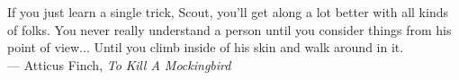 \thispagestyle{empty}
{}

\vspace*{3cm}

\begin{center}
    If you just learn a single trick, Scout, you'll get along a lot better with all kinds of folks. You never really understand a person until you consider things from his point of view... Until you climb inside of his skin and walk around in it.  \\ \medskip
    --- Atticus Finch, \emph{To Kill A Mockingbird}   
\end{center}